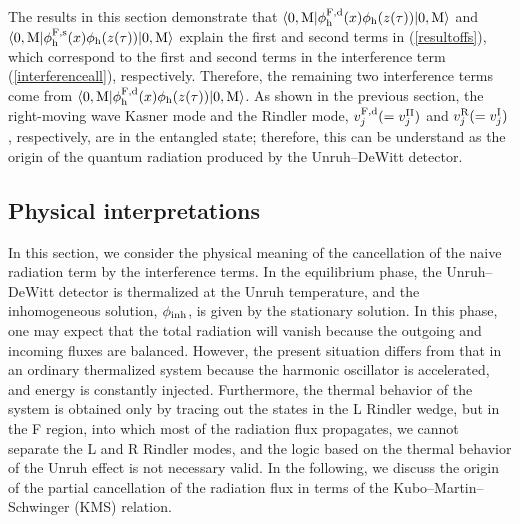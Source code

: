 \documentclass[aps,prd,preprintnumbers,nofootinbib,showpacs,11pt]{revtex4}%
\begin{document}
\begin{widetext}
The results in this section demonstrate that 
$\langle0,{\rm M}| \phi_{\rm h}^{\rm F,d}(x) \phi_{\rm h}(z(\tau))|0,{\rm M}\rangle$
and 
$\langle0,{\rm M}| \phi_{\rm h}^{\rm F,s}(x) \phi_{\rm h}(z(\tau))|0,{\rm M}\rangle$
explain the first and second terms in (\ref{resultoffs}), 
which correspond to the first and second terms in 
the interference term (\ref{interferenceall}), respectively. 
Therefore, the remaining two interference terms come from 
$\langle0,{\rm M}| \phi_{\rm h}^{\rm F,d}(x) \phi_{\rm h}(z(\tau))|0,{\rm M}\rangle$. 
As shown in the previous section, 
the right-moving wave Kasner mode and the Rindler mode, 
$v_j^{\rm F,d}(=v^{\rm II}_j)$ and $v_j^{\rm R}(=v^{\rm I}_j)$, respectively, are in the entangled state; 
therefore, this can be understand as the origin of the quantum radiation produced 
by the Unruh--DeWitt detector. 

\subsection{Physical interpretations}
In this section, we consider the physical meaning of the cancellation of the
naive radiation term by the interference terms. 
In the equilibrium phase, the Unruh--DeWitt detector is thermalized at the Unruh temperature, 
and the inhomogeneous solution, $\phi_{\rm inh}$, is given by the stationary solution. 
In this phase, one may expect that the total radiation will vanish because 
the outgoing and incoming fluxes are balanced.
However, the present situation differs from that in an ordinary thermalized system because 
the harmonic oscillator is accelerated, and energy is constantly injected. 
Furthermore, the thermal behavior of the system is obtained only by tracing out the
states in the L Rindler wedge, but in the F region, into which most of the radiation flux propagates, 
we cannot separate the L and R Rindler modes, and 
the logic based on the thermal behavior of the Unruh effect is not necessary valid. 
In the following, we discuss the origin of the partial cancellation
of the radiation flux in terms of the Kubo--Martin--Schwinger (KMS) relation.


\end{widetext}
\end{document}
